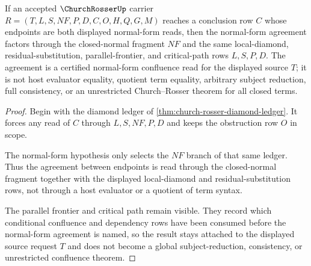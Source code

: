 \begin{theorem}
\label{thm:church-rosser-normal-form-confluence}
If an accepted $\ChurchRosserUp$ carrier $R=(T,L,S,NF,P,D,C,O,H,Q,G,M)$ reaches a conclusion row $C$ whose endpoints are both displayed normal-form reads, then the normal-form agreement factors through the closed-normal fragment $NF$ and the same local-diamond, residual-substitution, parallel-frontier, and critical-path rows $L,S,P,D$. The agreement is a certified normal-form confluence read for the displayed source $T$; it is not host evaluator equality, quotient term equality, arbitrary subject reduction, full consistency, or an unrestricted Church--Rosser theorem for all closed terms.
\end{theorem}
\begin{proof}
Begin with the diamond ledger of \autoref{thm:church-rosser-diamond-ledger}. It forces any read of $C$ through $L,S,NF,P,D$ and keeps the obstruction row $O$ in scope.

The normal-form hypothesis only selects the $NF$ branch of that same ledger. Thus the agreement between endpoints is read through the closed-normal fragment together with the displayed local-diamond and residual-substitution rows, not through a host evaluator or a quotient of term syntax.

The parallel frontier and critical path remain visible. They record which conditional confluence and dependency rows have been consumed before the normal-form agreement is named, so the result stays attached to the displayed source request $T$ and does not become a global subject-reduction, consistency, or unrestricted confluence theorem.
\end{proof}

